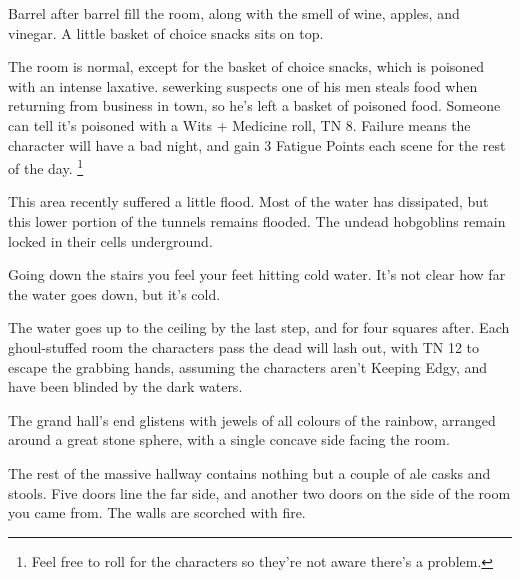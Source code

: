 \begin{multicols}{2}
\begin{boxtext}
\end{boxtext}


\begin{boxtext}

	Barrel after barrel fill the room, along with the smell of wine, apples, and vinegar.  A little basket of choice snacks sits on top.

\end{boxtext}

The room is normal, except for the basket of choice snacks, which is poisoned with an intense laxative.
\Gls{sewerking} suspects one of his men steals food when returning from business in \gls{town}, so he's left a basket of poisoned food.
Someone can tell it's poisoned with a Wits + Medicine roll, TN 8.
Failure means the character will have a bad night, and gain 3 Fatigue Points each scene for the rest of the day.%
\footnote{Feel free to roll for the characters so they're not aware there's a problem.}


This area recently suffered a little flood.  Most of the water has dissipated, but this lower portion of the tunnels remains flooded.  The undead hobgoblins remain locked in their cells underground.


\begin{boxtext}
	Going down the stairs you feel your feet hitting cold water.  It's not clear how far the water goes down, but it's cold.
\end{boxtext}

The water goes up to the ceiling by the last step, and for four squares after.  Each ghoul-stuffed room the characters pass the dead will lash out, with TN 12 to escape the grabbing hands, assuming the characters aren't Keeping Edgy, and have been blinded by the dark waters.



\begin{boxtext}
	The grand hall's end glistens with jewels of all colours of the rainbow, arranged around a great stone sphere, with a single concave side facing the room.

	The rest of the massive hallway contains nothing but a couple of ale casks and stools.  Five doors line the far side, and another two doors on the side of the room you came from.  The walls are scorched with fire.

\end{boxtext}


\end{multicols}
